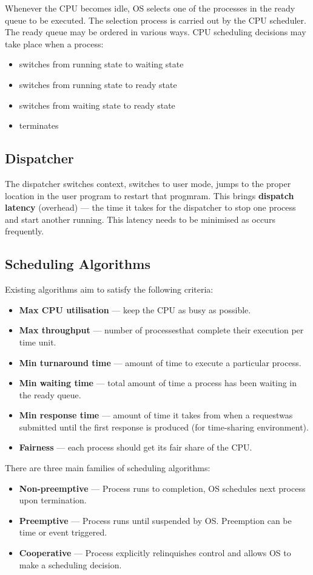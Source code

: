 \documentclass{article}%
\begin{document}
Whenever the CPU becomes idle, OS selects one of the processes in the ready queue to be executed.
The selection process is carried out by the CPU scheduler.
The ready queue may be ordered in various ways.
CPU scheduling decisions may take place when a process:
\begin{itemize}
	\item switches from running state to waiting state
	\item switches from running state to ready state
	\item switches from waiting state to ready state
	\item terminates
\end{itemize}

\subsection{Dispatcher}
The dispatcher switches context, switches to user mode, jumps to the proper location in the user program to restart that progmram.
This brings \textbf{dispatch latency} (overhead) --- the time it takes for the dispatcher to stop one process and start another running.
This latency needs to be minimised as occurs frequently.

\subsection{Scheduling Algorithms}
Existing algorithms aim to satisfy the following criteria:
\begin{itemize}
	\item \textbf{Max CPU utilisation} --- keep the CPU as busy as possible.
	\item \textbf{Max throughput} --- number of processesthat complete their execution per time unit.
	\item \textbf{Min turnaround time} --- amount of time to execute a particular process.
	\item \textbf{Min waiting time} --- total amount of time a process has been waiting in the ready queue.
	\item \textbf{Min response time} --- amount of time it takes from when a requestwas submitted until the first response is produced (for time-sharing environment).
	\item \textbf{Fairness} --- each process should get its fair share of the CPU.
\end{itemize}

There are three main families of scheduling algorithms:
\begin{itemize}
	\item \textbf{Non-preemptive} --- Process runs to completion, OS schedules next process upon termination.
	\item \textbf{Preemptive} --- Process runs until suspended by OS. Preemption can be time or event triggered.
	\item \textbf{Cooperative} --- Process explicitly relinquishes control and allows OS to make a scheduling decision.
\end{itemize}
\end{document}
